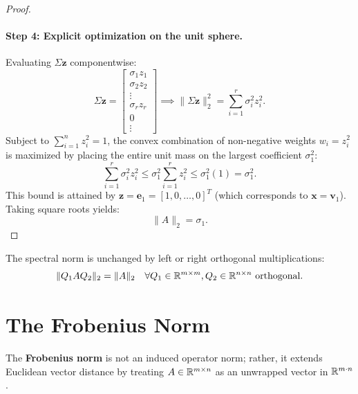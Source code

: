 \begin{proof}
\paragraph{Step 4: Explicit optimization on the unit sphere.}
Evaluating $\Sigma \mathbf{z}$ componentwise:
\begin{equation}
    \Sigma \mathbf{z} = \begin{bmatrix} \sigma_1 z_1 \\ \sigma_2 z_2 \\ \vdots \\ \sigma_r z_r \\ 0 \\ \vdots \end{bmatrix} \implies \|\Sigma \mathbf{z}\|_2^2 = \sum_{i=1}^r \sigma_i^2 z_i^2.
\end{equation}
Subject to $\sum_{i=1}^n z_i^2 = 1$, the convex combination of non-negative weights $w_i = z_i^2$ is maximized by placing the entire unit mass on the largest coefficient $\sigma_1^2$:
\begin{equation}
    \sum_{i=1}^r \sigma_i^2 z_i^2 \le \sigma_1^2 \sum_{i=1}^r z_i^2 \le \sigma_1^2 (1) = \sigma_1^2.
\end{equation}
This bound is attained by $\mathbf{z} = \mathbf{e}_1 = [1, 0, \dots, 0]^T$ (which corresponds to $\mathbf{x} = \mathbf{v}_1$). Taking square roots yields:
\begin{equation}
    \|A\|_2 = \sigma_1.
\end{equation}
\end{proof}

\begin{corollary}
The spectral norm is unchanged by left or right orthogonal multiplications:
\begin{equation}
    \|Q_1 A Q_2\|_2 = \|A\|_2 \quad \forall Q_1 \in \mathbb{R}^{m \times m}, Q_2 \in \mathbb{R}^{n \times n} \text{ orthogonal}.
\end{equation}
\end{corollary}

\FloatBarrier
\section{The Frobenius Norm}
\label{sec:frobenius-norm-en}

The \textbf{Frobenius norm} is not an induced operator norm; rather, it extends Euclidean vector distance by treating $A \in \mathbb{R}^{m \times n}$ as an unwrapped vector in $\mathbb{R}^{m \cdot n}$.

